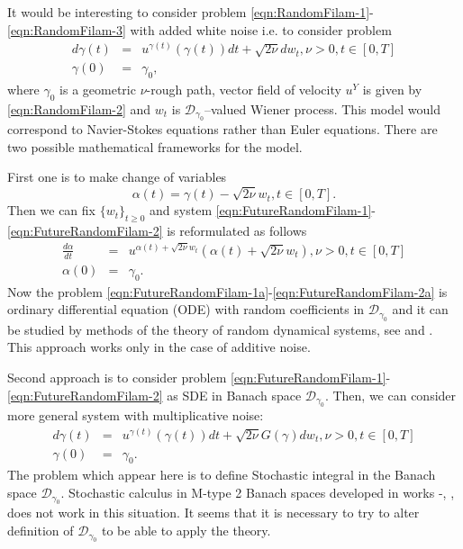 \documentclass[11pt,a4paper,leqno]{amsart}%
\theoremstyle{plain}
\theoremstyle{remark}
\theoremstyle{plain}
\numberwithin{equation}{section}
\begin{document}
It would be interesting to consider problem
\eqref{eqn:RandomFilam-1}-\eqref{eqn:RandomFilam-3} with added
white noise i.e. to consider problem
\begin{eqnarray}
d\gamma(t) &=& u^{\gamma(t)}(\gamma(t))dt+\sqrt{2\nu}dw_t,\nu>0,t\in [0,T] \label{eqn:FutureRandomFilam-1}\\
\gamma(0) &=& \gamma_0,\label{eqn:FutureRandomFilam-2}
\end{eqnarray}
where $\gamma_0$ is a geometric $\nu$-rough path, vector field of velocity $u^Y$ is given by
\eqref{eqn:RandomFilam-2} and $w_t$ is $\mathcal{D}_{\gamma_0}$--valued
Wiener process. This model would correspond to Navier-Stokes
equations rather than Euler equations. There are two possible
mathematical frameworks for the model.

First one is to make change of variables
$$
\alpha(t)=\gamma(t)-\sqrt{2\nu}w_t, t\in[0,T].
$$
Then we can fix $\{w_t\}_{t\geq 0}$ and system
\eqref{eqn:FutureRandomFilam-1}-\eqref{eqn:FutureRandomFilam-2} is
reformulated as follows
\begin{eqnarray}
\frac{d\alpha}{dt} &=& u^{\alpha(t)+\sqrt{2\nu}w_t}(\alpha(t)+\sqrt{2\nu}w_t),\nu>0,t\in [0,T] \label{eqn:FutureRandomFilam-1a}\\
\alpha(0) &=& \gamma_0.\label{eqn:FutureRandomFilam-2a}
\end{eqnarray}
Now the problem
\eqref{eqn:FutureRandomFilam-1a}-\eqref{eqn:FutureRandomFilam-2a}
is ordinary differential equation (ODE) with random coefficients
in $\mathcal{D}_{\gamma_0}$ and it can be studied by methods of the theory
of random dynamical systems, see \cite{[Arnold-98]} and
\cite{[DuanLuSchmalfus-2003]}. This approach works only in the
case of additive noise.

Second approach is to consider problem
\eqref{eqn:FutureRandomFilam-1}-\eqref{eqn:FutureRandomFilam-2} as
SDE in Banach space $\mathcal{D}_{\gamma_0}$. Then, we can consider more
general system with multiplicative noise:
\begin{eqnarray}
d\gamma(t) &=& u^{\gamma(t)}(\gamma(t))dt+\sqrt{2\nu}G(\gamma)dw_t,\nu>0,t\in [0,T] \label{eqn:FutureRandomFilam-1b}\\
\gamma(0) &=& \gamma_0.\label{eqn:FutureRandomFilam-2b}
\end{eqnarray}
The problem which appear here is to define Stochastic integral in
the Banach space $\mathcal{D}_{\gamma_0}$. Stochastic calculus in M-type 2
Banach spaces developed in works
\cite{[Dettweiler-85]}-\cite{[Dettweiler-91]}, \cite{[Brz-95]},
\cite{[Brz-03]} does not work in this situation. It seems that it
is necessary to try to alter definition of $\mathcal{D}_{\gamma_0}$ to be
able to apply the theory.
\end{document}
